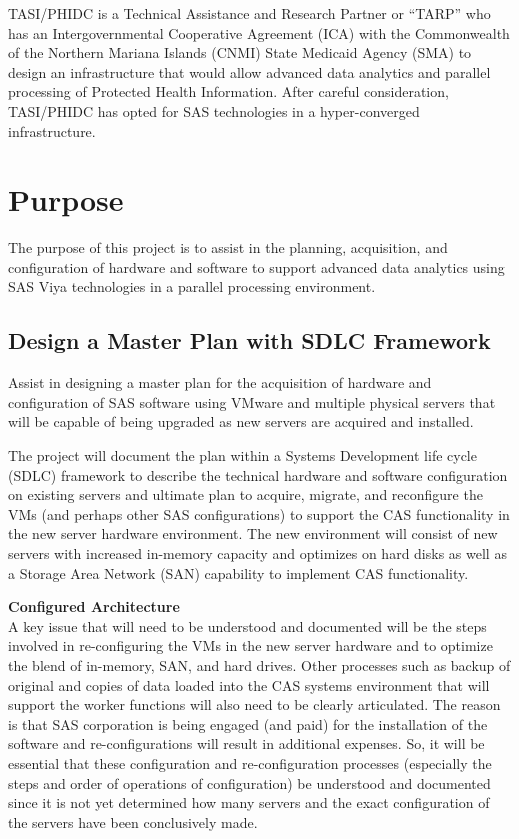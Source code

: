 \documentclass[11pt]{article}
\begin{document}
TASI/PHIDC is a Technical Assistance and Research Partner or “TARP” who has an Intergovernmental Cooperative Agreement (ICA) with the Commonwealth of the Northern Mariana Islands (CNMI) State Medicaid Agency (SMA) to design an infrastructure that would allow advanced data analytics and parallel processing of Protected Health Information. After careful consideration, TASI/PHIDC has opted for SAS technologies in a hyper-converged infrastructure.


\clearpage 

\section{Purpose}
The purpose of this project is to assist in the planning, acquisition, and configuration of hardware and software to support advanced data analytics using SAS Viya technologies in a parallel processing environment. 

\subsection{Design a Master Plan with SDLC Framework}
Assist in designing a master plan for the acquisition of hardware and configuration of SAS software using VMware and multiple physical servers that will be capable of being upgraded as new servers are acquired and installed.  

The project will document the plan within a Systems Development life cycle (SDLC) framework to describe the technical hardware and software configuration on existing servers and ultimate plan to acquire, migrate, and reconfigure the VMs (and perhaps other SAS configurations) to support the CAS functionality in the new server hardware environment. The new environment will consist of new servers with increased in-memory capacity and optimizes on hard disks as well as a Storage Area Network (SAN) capability to implement CAS functionality.

\textbf{Configured Architecture}\\
A key issue that will need to be understood and documented will be the steps involved in re-configuring the VMs in the new server hardware and to optimize the blend of in-memory, SAN, and hard drives. Other processes such as backup of original and copies of data loaded into the CAS systems environment that will support the worker functions will also need to be clearly articulated. The reason is that SAS corporation is being engaged (and paid) for the installation of the software and re-configurations will result in additional expenses. So, it will be essential that these configuration and re-configuration processes (especially the steps and order of operations of configuration) be understood and documented since it is not yet determined how many servers and the exact configuration of the servers have been conclusively made.
\end{document}
